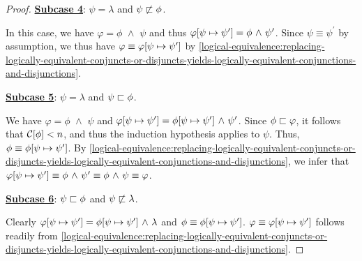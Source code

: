 \begin{proof}
    \vspace{0.3cm}
    \noindent
    \underline{\textbf{Subcase 4}}: \( \psi = \lambda \) and \( \psi  \not\sqsubset {\phi} \).

    \vspace{0.1cm}
    \noindent
    In this case, we have \( \varphi =  \phi \,\,{\land}\,\, \psi \) and thus
    \( \folsubformulasubstitution{\varphi}{\psi}{\psi^{\prime}} = \phi \,\,{\land}\,\, \psi^{\prime} \).
    Since \( \psi \equiv \psi^{\prime} \) by assumption, we thus have \( \varphi \equiv \folsubformulasubstitution{\varphi}{\psi}{\psi^{\prime}} \)
    by \cref{logical-equivalence:replacing-logically-equivalent-conjuncts-or-disjuncts-yields-logically-equivalent-conjunctions-and-disjunctions}.

    \vspace{0.3cm}
    \noindent
    \underline{\textbf{Subcase 5}}: \( \psi = \lambda \) and \( \psi  \sqsubset {\phi} \).

    \vspace{0.1cm}
    \noindent
    We have \( \varphi = \phi \,\,{\land}\,\, \psi \) and
    \( \folsubformulasubstitution{\varphi}{\psi}{\psi^{\prime}} = \folsubformulasubstitution{\phi}{\psi}{\psi^{\prime}} \,\,{\land}\,\, \psi^{\prime} \).
    Since \( \phi  \sqsubset  \varphi \), it follows that \( \folcomplexityofformula{\phi} < n \), and thus the induction hypothesis applies to \( \psi \).
    Thus, \( \phi \equiv \folsubformulasubstitution{\phi}{\psi}{\psi^{\prime}} \).
    By \cref{logical-equivalence:replacing-logically-equivalent-conjuncts-or-disjuncts-yields-logically-equivalent-conjunctions-and-disjunctions}, we infer that
    \( \folsubformulasubstitution{\varphi}{\psi}{\psi^{\prime}} \equiv \phi \,\,{\land}\,\, \psi^{\prime} \equiv \phi \,\,{\land}\,\, \psi \equiv \varphi \).

    \vspace{0.3cm}
    \noindent
    \underline{\textbf{Subcase 6}}: \( \psi  \sqsubset  \phi \) and \( \psi  \not\sqsubset  \lambda \).

    \vspace{0.1cm}
    \noindent
    Clearly \( \folsubformulasubstitution{\varphi}{\psi}{\psi^{\prime}} = \folsubformulasubstitution{\phi}{\psi}{\psi^{\prime}} \,\,{\land}\,\, \lambda \)
    and \( \phi \equiv \folsubformulasubstitution{\phi}{\psi}{\psi^{\prime}} \).
    \( \varphi \equiv \folsubformulasubstitution{\varphi}{\psi}{\psi^{\prime}} \) follows readily from
    \cref{logical-equivalence:replacing-logically-equivalent-conjuncts-or-disjuncts-yields-logically-equivalent-conjunctions-and-disjunctions}.


\end{proof}
